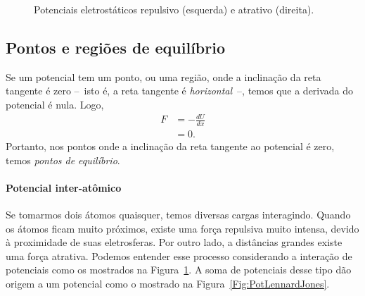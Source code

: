 \begin{figure}
\begin{minipage}[c]{0.45\linewidth}
\end{minipage}
\caption{Potenciais eletrostáticos repulsivo (esquerda) e atrativo (direita). \label{Fig:PotencialEletromagRepulsivoAtrativo}}
\end{figure}

\subsection{Pontos e regiões de equilíbrio}

Se um potencial tem um ponto, ou uma região, onde a inclinação da reta tangente é zero --~isto é, a reta tangente é \emph{horizontal}~--, temos que a derivada do potencial é nula. Logo,
\begin{align}
    F &= - \frac{dU}{dx} \\
    &= 0.
\end{align}
%
Portanto, nos pontos onde a inclinação da reta tangente ao potencial é zero, temos \emph{pontos de equilíbrio}.

\paragraph{Potencial inter-atômico}

Se tomarmos dois átomos quaisquer, temos diversas cargas interagindo. Quando os átomos ficam muito próximos, existe uma força repulsiva muito intensa, devido à proximidade de suas eletrosferas. Por outro lado, a distâncias grandes existe uma força atrativa. Podemos entender esse processo considerando a interação de potenciais como os mostrados na Figura~\ref{Fig:PotencialEletromagRepulsivoAtrativo}. A soma de potenciais desse tipo dão origem a um potencial como o mostrado na Figura~\ref{Fig:PotLennardJones}.

